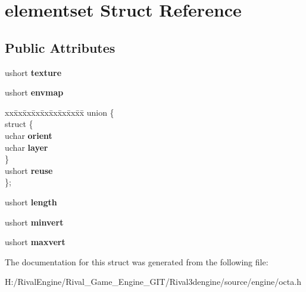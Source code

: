 \hypertarget{structelementset}{}\section{elementset Struct Reference}
\label{structelementset}
\subsection*{Public Attributes}
\begin{DoxyCompactItemize}
\item 
\mbox{\label{structelementset_ad9e921699e354c4b38f8f582aea48a32}} 
ushort {\bfseries texture}
\item 
\mbox{\label{structelementset_add673a9cfbe9161c7585264abf600838}} 
ushort {\bfseries envmap}
\item 
\mbox{\label{structelementset_aff80cf1b52eece3114c2a63c4c48cc75}} 
\begin{tabbing}
xx\=xx\=xx\=xx\=xx\=xx\=xx\=xx\=xx\=\kill
union \{\\
\mbox{\label{unionelementset_1_1_0D41_a1bcc18959a1c62a17df4bcb93e318f98}} 
\>struct \{\\
\>\>uchar {\bfseries orient}\\
\>\>uchar {\bfseries layer}\\
\>\} \\
\>ushort {\bfseries reuse}\\
\}; \\

\end{tabbing}\item 
\mbox{\label{structelementset_a8fbb5ad3d066b997c182bda1c4416e97}} 
ushort {\bfseries length}
\item 
\mbox{\label{structelementset_ac07809a40ba539f3e9190661ee7f9efb}} 
ushort {\bfseries minvert}
\item 
\mbox{\label{structelementset_a2a1e83e8c8e2668133822af4b199c605}} 
ushort {\bfseries maxvert}
\end{DoxyCompactItemize}


The documentation for this struct was generated from the following file\+:\begin{DoxyCompactItemize}
\item 
H\+:/\+Rival\+Engine/\+Rival\+\_\+\+Game\+\_\+\+Engine\+\_\+\+G\+I\+T/\+Rival3dengine/source/engine/octa.\+h\end{DoxyCompactItemize}
